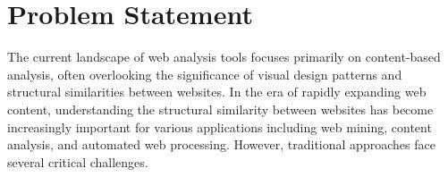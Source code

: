 \section{Problem Statement}
\label{sec:problem-statement}

The current landscape of web analysis tools focuses primarily on content-based analysis, often overlooking the significance of visual design patterns and structural similarities between websites. In the era of rapidly expanding web content, understanding the structural similarity between websites has become increasingly important for various applications including web mining, content analysis, and automated web processing. However, traditional approaches face several critical challenges.



    
    
    
